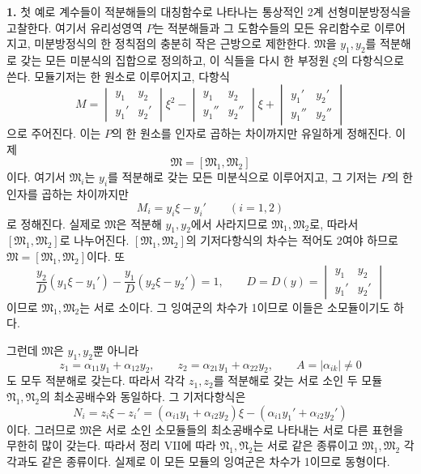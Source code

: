 
\textbf{1.} 첫 예로 계수들이 적분해들의 대칭함수로 나타나는 통상적인 2계 선형미분방정식을 고찰한다. 여기서 유리성영역 \(P\)는 적분해들과 그 도함수들의 모든 유리함수로 이루어지고, 미분방정식의 한 정칙점의 충분히 작은 근방으로 제한한다. \(\mathfrak M\)을 \(y_1,y_2\)를 적분해로 갖는 모든 미분식의 집합으로 정의하고, 이 식들을 다시 한 부정원 \(\xi\)의 다항식으로 쓴다. 모듈기저는 한 원소로 이루어지고, 다항식
\[
 M=
 \begin{vmatrix}y_1&y_2\\y_1'&y_2'\end{vmatrix}\xi^2
 -\begin{vmatrix}y_1&y_2\\y_1''&y_2''\end{vmatrix}\xi
 +\begin{vmatrix}y_1'&y_2'\\y_1''&y_2''\end{vmatrix}
\]
으로 주어진다. 이는 \(P\)의 한 원소를 인자로 곱하는 차이까지만 유일하게 정해진다. 이제
\begin{equation}
 \mathfrak M=[\mathfrak M_1,\mathfrak M_2]
\tag{41}
\end{equation}
이다. 여기서 \(\mathfrak M_i\)는 \(y_i\)를 적분해로 갖는 모든 미분식으로 이루어지고, 그 기저는 \(P\)의 한 인자를 곱하는 차이까지만
\[
 M_i=y_i\xi-y_i'\qquad(i=1,2)
\]
로 정해진다. 실제로 \(\mathfrak M\)은 적분해 \(y_1,y_2\)에서 사라지므로 \(\mathfrak M_1,\mathfrak M_2\)로, 따라서 \([\mathfrak M_1,\mathfrak M_2]\)로 나누어진다. \([\mathfrak M_1,\mathfrak M_2]\)의 기저다항식의 차수는 적어도 2여야 하므로 \(\mathfrak M=[\mathfrak M_1,\mathfrak M_2]\)이다. 또
\begin{equation}
 \frac{y_2}{D}(y_1\xi-y_1')
 -\frac{y_1}{D}(y_2\xi-y_2')=1,\qquad
 D=D(y)=\begin{vmatrix}y_1&y_2\\y_1'&y_2'\end{vmatrix}
\tag{42}
\end{equation}
이므로 \(\mathfrak M_1,\mathfrak M_2\)는 서로 소이다. 그 잉여군의 차수가 1이므로 이들은 소모듈이기도 하다.

그런데 \(\mathfrak M\)은 \(y_1,y_2\)뿐 아니라
\[
 z_1=\alpha_{11}y_1+\alpha_{12}y_2,\qquad
 z_2=\alpha_{21}y_1+\alpha_{22}y_2,\qquad
 A=|\alpha_{ik}|\ne0
\]
도 모두 적분해로 갖는다. 따라서 각각 \(z_1,z_2\)를 적분해로 갖는 서로 소인 두 모듈 \(\mathfrak N_1,\mathfrak N_2\)의 최소공배수와 동일하다. 그 기저다항식은
\[
 N_i=z_i\xi-z_i'
 =(\alpha_{i1}y_1+\alpha_{i2}y_2)\xi
  -(\alpha_{i1}y_1'+\alpha_{i2}y_2')
\]
이다. 그러므로 \(\mathfrak M\)은 서로 소인 소모듈들의 최소공배수로 나타내는 서로 다른 표현을 무한히 많이 갖는다. 따라서 정리 VII에 따라 \(\mathfrak N_1,\mathfrak N_2\)는 서로 같은 종류이고 \(\mathfrak M_1,\mathfrak M_2\) 각각과도 같은 종류이다. 실제로 이 모든 모듈의 잉여군은 차수가 1이므로 동형이다.

